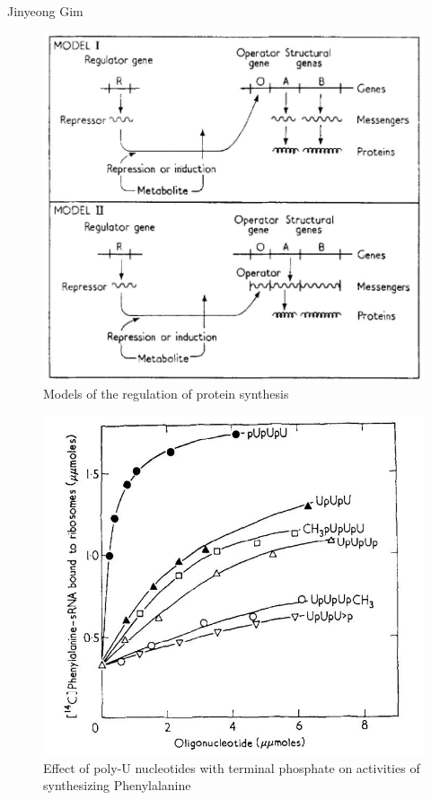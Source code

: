 \begin{artengenv}{Jinyeong Gim}
\begin{figure}[H]
 \begin{center}
 \includegraphics[width=.75\textwidth]{ART_Gim/fig.3300.jpg}%
 \end{center}%
 \caption{Models of the regulation of protein synthesis
 \parencite[][p.344]{jacob_genetic_1961}}\label{gim.fig3}
\end{figure}

\begin{figure}[H]
 \begin{center}
 \includegraphics[width=.8\textwidth]{ART_Gim/fig.4300.jpg}%
 \end{center}%
 \caption{Effect of poly-U nucleotides with terminal phosphate on activities of synthesizing Phenylalanine
 \parencite[][p.562]{rottman_rna_1966}}\label{gim.fig4}
\end{figure}



\end{artengenv}
